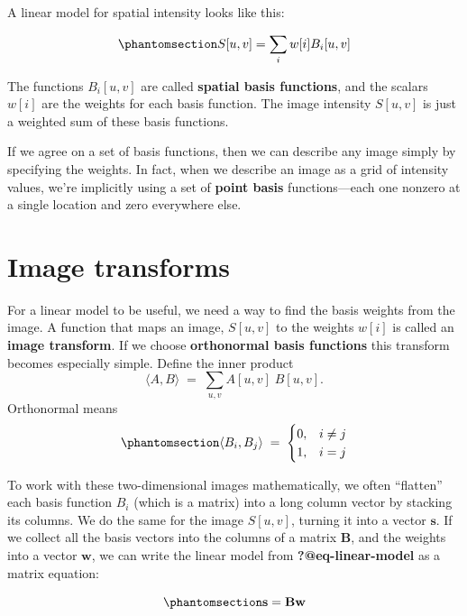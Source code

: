 \documentclass[
  letterpaper,
]{book}
\begin{document}
A linear model for spatial intensity looks like this:

\begin{equation}\phantomsection\label{eq-spatial-linear-model}{
S[u,v] = \sum_{i} w[i] B_i[u,v]
}\end{equation}

The functions \(B_i[u,v]\) are called \textbf{spatial basis functions},
and the scalars \(w[i]\) are the weights for each basis function. The
image intensity \(S[u,v]\) is just a weighted sum of these basis
functions.

If we agree on a set of basis functions, then we can describe any image
simply by specifying the weights. In fact, when we describe an image as
a grid of intensity values, we're implicitly using a set of
\textbf{point basis} functions---each one nonzero at a single location
and zero everywhere else.

\section{Image transforms}\label{sec-ls-orthogonal-transforms}

For a linear model to be useful, we need a way to find the basis weights
from the image. A function that maps an image, \(S[u,v]\) to the weights
\(w[i]\) is called an \textbf{image transform}. If we choose
\textbf{orthonormal basis functions} this transform becomes especially
simple. Define the inner product \[
\langle A, B \rangle \;=\; \sum_{u,v} A[u,v]\;B[u,v].
\] Orthonormal means
\begin{equation}\phantomsection\label{eq-spatial-orthonormal}{
\langle B_i, B_j \rangle \;=\; \begin{cases}
0, & i \ne j \\
1, & i=j
\end{cases}
}\end{equation}

To work with these two-dimensional images mathematically, we often
``flatten'' each basis function \(B_i\) (which is a matrix) into a long
column vector by stacking its columns. We do the same for the image
\(S[u,v]\), turning it into a vector \(\mathbf{s}\). If we collect all
the basis vectors into the columns of a matrix \(\mathbf{B}\), and the
weights into a vector \(\mathbf{w}\), we can write the linear model from
\textbf{?@eq-linear-model} as a matrix equation:

\begin{equation}\phantomsection\label{eq-linear-model-matrix}{
\mathbf{s} = \mathbf{B w}
}\end{equation}
\end{document}
